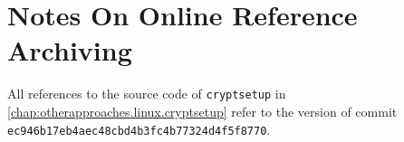 \chapter{Notes On Online Reference Archiving}
\label{chap:onlinereferences}
All references to the source code of \texttt{cryptsetup} in \autoref{chap:otherapproaches.linux.cryptsetup} refer to the version of commit \texttt{ec946b17eb4aec48cbd4b3fc4b77324d4f5f8770}.


